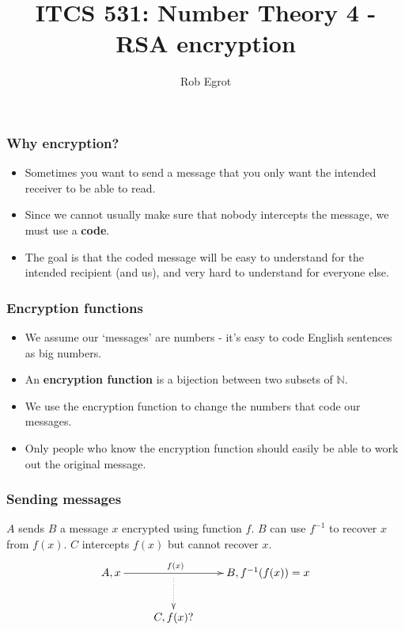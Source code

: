 \documentclass[handout]{beamer}
\title{ITCS 531: Number Theory 4 - RSA encryption}
\date{}
\author{Rob Egrot}
\newcommand{\bN}{\mathbb{N}}
\begin{document}
\begin{frame}
\titlepage
\end{frame}

\begin{frame}
\frametitle{Why encryption?}
\begin{itemize}
\item Sometimes you want to send a message that you only want the intended receiver to be able to read.
\vspace{1cm}
\item Since we cannot usually make sure that nobody intercepts the message, we must use a \textbf{code}.
\vspace{1cm}
\item The goal is that the coded message will be easy to understand for the intended recipient (and us), and very hard to understand for everyone else.

\end{itemize}
\end{frame}

\begin{frame}
\frametitle{Encryption functions}
\begin{itemize}
\item We assume our `messages' are numbers - it's easy to code English sentences as big numbers.
\vspace{1cm}
\item An \textbf{encryption function} is a bijection between two subsets of $\bN$.
\vspace{1cm}
\item We use the encryption function to change the numbers that code our messages.
\vspace{1cm}
\item Only people who know the encryption function should easily be able to work out the original message.
\end{itemize}
\end{frame}

\begin{frame}
\frametitle{Sending messages}
$A$ sends $B$ a message $x$ encrypted using function $f$. $B$ can use $f^{-1}$ to recover $x$ from $f(x)$. $C$ intercepts $f(x)$ but cannot recover $x$.
\[\xymatrix{A,x\ar[rr]^{f(x)\hspace{.9cm}} &\ar@{..>}[d] & B,f^{-1}(f(x))=x\\
& C, f(x)?}\]
\end{frame}
\end{document}
